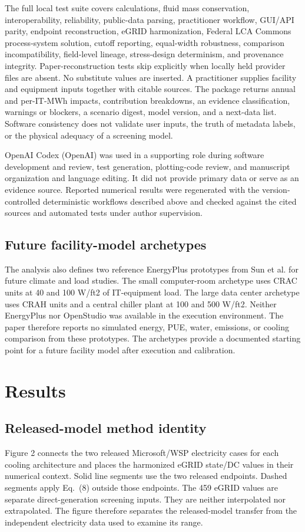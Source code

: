\documentclass[review,a4paper,fleqn]{cas-sc}
\begin{document}
The full local test suite covers calculations, fluid mass conservation, interoperability, reliability, public-data parsing, practitioner workflow, GUI/API parity, endpoint reconstruction, eGRID harmonization, Federal LCA Commons process-system solution, cutoff reporting, equal-width robustness, comparison incompatibility, field-level lineage, stress-design determinism, and provenance integrity. Paper-reconstruction tests skip explicitly when locally held provider files are absent. No substitute values are inserted. A practitioner supplies facility and equipment inputs together with citable sources. The package returns annual and per-IT-MWh impacts, contribution breakdowns, an evidence classification, warnings or blockers, a scenario digest, model version, and a next-data list. Software consistency does not validate user inputs, the truth of metadata labels, or the physical adequacy of a screening model.

OpenAI Codex (OpenAI) was used in a supporting role during software development and review, test generation, plotting-code review, and manuscript organization and language editing. It did not provide primary data or serve as an evidence source. Reported numerical results were regenerated with the version-controlled deterministic workflows described above and checked against the cited sources and automated tests under author supervision.

\subsection{Future facility-model archetypes}
The analysis also defines two reference EnergyPlus prototypes from Sun et al. \cite{ref49} for future climate and load studies. The small computer-room archetype uses CRAC units at 40 and 100 W/ft2 of IT-equipment load. The large data center archetype uses CRAH units and a central chiller plant at 100 and 500 W/ft2. Neither EnergyPlus nor OpenStudio was available in the execution environment. The paper therefore reports no simulated energy, PUE, water, emissions, or cooling comparison from these prototypes. The archetypes provide a documented starting point for a future facility model after execution and calibration.

\section{Results}
\subsection{Released-model method identity}
Figure 2 connects the two released Microsoft/WSP electricity cases for each cooling architecture and places the harmonized eGRID state/DC values in their numerical context. Solid line segments use the two released endpoints. Dashed segments apply Eq.~(8) outside those endpoints. The 459 eGRID values are separate direct-generation screening inputs. They are neither interpolated nor extrapolated. The figure therefore separates the released-model transfer from the independent electricity data used to examine its range.
\end{document}
